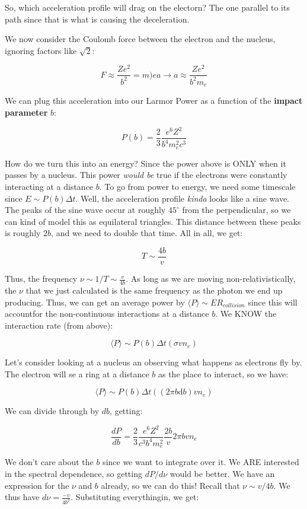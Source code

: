 \documentclass{article}
\begin{document}
So, which acceleration profile will drag on the electorn? The one parallel to its path since that is what is causing the deceleration. 

We now consider the Coulomb force between the electron and the nucleus, ignoring factors like $\sqrt2$:

$$
F \approx \frac{Ze^2}{b^2} = m)e a \rightarrow a \approx \frac{Ze^2}{b^2 m_e}
$$

We can plug this acceleration into our Larmor Power as a function of the \textbf{impact parameter} $b$:

$$
P(b) = \frac23 \frac{e^6 Z^2}{b^4 m_e^2 c^3}
$$

How do we turn this into an energy? Since the power above is ONLY when it passes by a nucleus. This power \textit{would be} true if the electrons were constantly interacting at a distance $b$. To go from power to energy, we need some timescale since $E \sim P(b) \Delta t$. Well, the acceleration profile \textit{kinda} looks like a sine wave. The peaks of the sine wave occur at roughly $45^\circ$ from the perpendicular, so we can kind of model this as equilateral triangles. This distance between these peaks is roughly $2b$, and we need to double that time. All in all, we get:

$$
T \sim \frac{4b}{v}
$$

Thus, the frequency $\nu \sim 1/T \sim \frac{v}{4b}$. As long as we are moving non-relativistically, the $\nu$ that we just calculated is the same frequency as the photon we end up producing. Thus, we can get an average power by $\langle P \rangle \sim E R_{collision}$ since this will accountfor the non-continuous interactions at a distance $b$. We KNOW the interaction rate (from above):

$$
\langle P \rangle \sim P(b) \Delta t \left(\sigma v n_e\right)
$$

Let's consider looking at a nucleus an observing what happens as electrons fly by. The electron will se a ring at a distance $b$ as the place to interact, so we have:

$$
\langle P \rangle \sim P(b) \Delta t \left(\left(2 \pi b \text{d}b\right) v n_e\right)
$$

We can divide through by $db$, getting:

$$
\frac{dP}{db} = \frac23 \frac{e^6 Z^2}{c^3 b^4 m_e^2}\frac{2b}{v} 2\pi b v n_e
$$

We don't care about the $b$ since we want to integrate over it. We ARE interested in the spectral dependence, so getting $dP/d\nu$ would be better. We have an expression for the $\nu$ and $b$ already, so we can do this! Recall that $\nu \sim v/4b$. We thus have $d\nu= \frac{-v}{4b^2}$. Substituting everythingin, we get:
\end{document}
